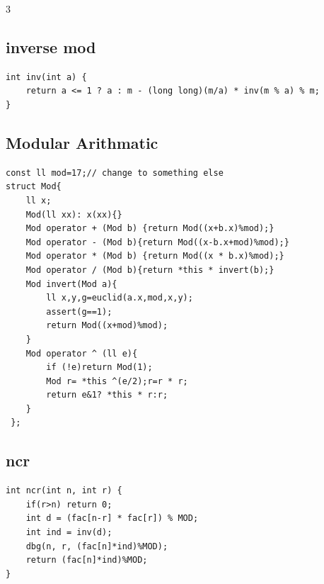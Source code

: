 \documentclass[twoside]{article}
\begin{document}
\begin{multicols*}{3}
{\subsection*{inverse mod}
}
\begin{verbatim}
int inv(int a) {
    return a <= 1 ? a : m - (long long)(m/a) * inv(m % a) % m;
}
\end{verbatim}

{
\subsection*{Modular Arithmatic}
}
\begin{verbatim}
const ll mod=17;// change to something else
struct Mod{
    ll x;
    Mod(ll xx): x(xx){}
    Mod operator + (Mod b) {return Mod((x+b.x)%mod);}
    Mod operator - (Mod b){return Mod((x-b.x+mod)%mod);}
    Mod operator * (Mod b) {return Mod((x * b.x)%mod);}
    Mod operator / (Mod b){return *this * invert(b);}
    Mod invert(Mod a){
        ll x,y,g=euclid(a.x,mod,x,y);
        assert(g==1); 
        return Mod((x+mod)%mod);
    }
    Mod operator ^ (ll e){
        if (!e)return Mod(1);
        Mod r= *this ^(e/2);r=r * r;
        return e&1? *this * r:r;
    }
 };
\end{verbatim}

{
\subsection*{ncr}
}
\begin{verbatim}
int ncr(int n, int r) {
    if(r>n) return 0;
    int d = (fac[n-r] * fac[r]) % MOD;
    int ind = inv(d);
    dbg(n, r, (fac[n]*ind)%MOD);
    return (fac[n]*ind)%MOD;
}
\end{verbatim}

{
}
\end{multicols*}
\end{document}
